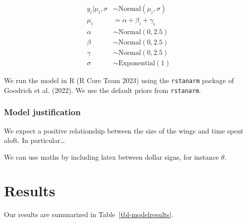 \documentclass[
  letterpaper,
  DIV=11,
  numbers=noendperiod]{scrartcl}
\begin{document}
\begin{align} 
y_i|\mu_i, \sigma &\sim \mbox{Normal}(\mu_i, \sigma) \\
\mu_i &= \alpha + \beta_i + \gamma_i\\
\alpha &\sim \mbox{Normal}(0, 2.5) \\
\beta &\sim \mbox{Normal}(0, 2.5) \\
\gamma &\sim \mbox{Normal}(0, 2.5) \\
\sigma &\sim \mbox{Exponential}(1)
\end{align}

We run the model in R (R Core Team 2023) using the \texttt{rstanarm}
package of Goodrich et al. (2022). We use the default priors from
\texttt{rstanarm}.

\subsubsection{Model justification}\label{model-justification}

We expect a positive relationship between the size of the wings and time
spent aloft. In particular\ldots{}

We can use maths by including latex between dollar signs, for instance
\(\theta\).

\section{Results}\label{results}

Our results are summarized in Table~\ref{tbl-modelresults}.
\end{document}
